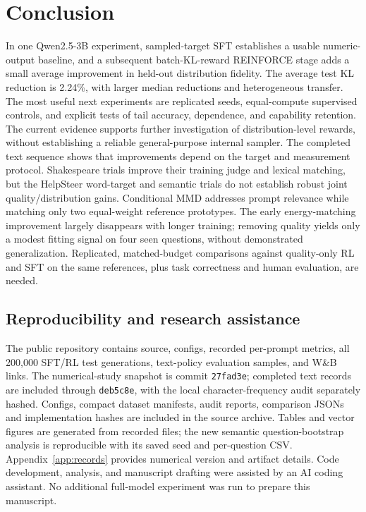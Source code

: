 \documentclass[11pt,letterpaper]{article}
\begin{document}
\section{Conclusion}
In one Qwen2.5-3B experiment, sampled-target SFT establishes a usable
numeric-output baseline, and a subsequent batch-KL-reward REINFORCE stage
adds a small average improvement in held-out distribution fidelity.
The average test KL reduction is 2.24\%, with larger median reductions
and heterogeneous transfer. The most useful next experiments are
replicated seeds, equal-compute supervised controls, and explicit tests
of tail accuracy, dependence, and capability retention. The current
evidence supports further investigation of distribution-level rewards,
without establishing a reliable general-purpose internal sampler.
The completed text sequence shows that improvements depend on the target
and measurement protocol. Shakespeare trials improve their training judge
and lexical matching, but the HelpSteer word-target and semantic trials do
not establish robust joint quality/distribution gains. Conditional MMD
addresses prompt relevance while matching only two equal-weight reference
prototypes. The early energy-matching improvement largely disappears with
longer training; removing quality yields only a modest fitting signal on
four seen questions, without demonstrated generalization. Replicated,
matched-budget comparisons against quality-only RL and SFT on the same
references, plus task correctness and human evaluation, are needed.

\begin{samepage}
\section*{Reproducibility and research assistance}
The public repository contains source, configs, recorded per-prompt metrics,
all 200,000 SFT/RL test generations, text-policy evaluation samples, and
W\&B links. The numerical-study snapshot is commit \texttt{27fad3e};
completed text records are included through \texttt{deb5c8e}, with the
local character-frequency audit separately hashed. Configs, compact
dataset manifests, audit reports, comparison JSONs and implementation
hashes are included in the source archive. Tables and vector figures
are generated from recorded files; the new semantic question-bootstrap
analysis is reproducible with its saved seed and per-question CSV.
Appendix~\ref{app:records} provides numerical version and artifact
details. Code development, analysis, and manuscript drafting were assisted
by an AI coding assistant. No additional full-model experiment was run
to prepare this manuscript.
\end{samepage}

\clearpage
\begingroup
\small
\setlength{\bibsep}{3pt}


\endgroup
\clearpage
\appendix

\end{document}
